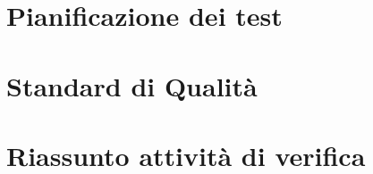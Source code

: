 \newpage
\section{Pianificazione dei test}


\newpage
\section{Standard di Qualità}


\appendix

\newpage
\section{Riassunto attività di verifica}





